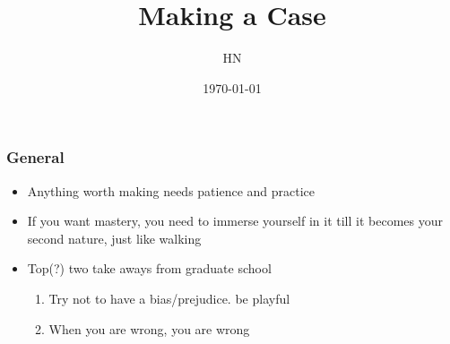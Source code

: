 \documentclass[serif, xcolor={dvipsnames}]{beamer} %
\title{Making a Case}
\author{HN}
\institute[WSU]{Washington State University}
\date{\today}
\newcommand\dangersign[1][2ex]{%
  \renewcommand\stacktype{L}%
  \scaleto{\stackon[1.3pt]{\color{red}$\triangle$}{\tiny !}}{#1}%
}
\newcommand{\Rq}{{\faSearch~}}
\begin{document}
\maketitle



\begin{frame}
\frametitle{General}

\begin{itemize}
\item Anything worth making needs patience and practice
\item If you want mastery, you need to immerse yourself in it till it becomes your second nature, just like walking

\vspace{.5in}
\item Top(?) two take aways from graduate school
\begin{enumerate}
\item Try not to have a bias/prejudice. be playful \Rq
\item When you are wrong, you are wrong \dangersign
\end{enumerate}
\end{itemize}
\end{frame}
\end{document}

